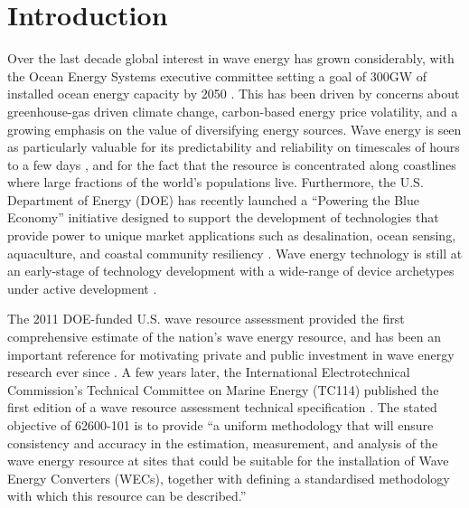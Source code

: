 \section{Introduction}

Over the last decade global interest in wave energy has grown
considerably, with the Ocean Energy Systems executive committee
setting a goal of 300GW of installed ocean energy capacity by 2050
\citep[]{huckerbyInternationalVisionOcean2017}. This has been driven
by concerns about greenhouse-gas driven climate change, carbon-based
energy price volatility, and a growing emphasis on the value of
diversifying energy sources. Wave energy is seen as particularly
valuable for its predictability and reliability on timescales of hours
to a few days \citep{parkinsonIntegratingOceanWave2015}, and for the
fact that the resource is concentrated along coastlines where large
fractions of the world's populations live. Furthermore, the
U.S. Department of Energy (DOE) has recently launched a ``Powering the Blue
Economy'' initiative designed to support the development of
technologies that provide power to unique market applications such as
desalination, ocean sensing, aquaculture, and coastal community
resiliency \citep{livecchiPoweringBlueEconomy2019}. Wave energy technology is still at an
early-stage of technology development with a wide-range of device
archetypes under active development
\citep[]{babaritOceanWaveEnergy2017}.

The 2011 DOE-funded U.S. wave resource assessment provided the first
comprehensive estimate of the nation’s wave energy resource, and has
been an important reference for motivating private and public
investment in wave energy research ever since
\citep[][hereafter `EPRI 2011']{EPRIwaveresource2011}. A few years later, the International Electrotechnical Commission's Technical Committee on
Marine Energy (TC114) published the first edition of a wave
resource assessment technical specification \citep[][hereafter, 62600-101]{internationalelectrotechnicalcommissionPart101Wave2015}. The stated objective of 62600-101 is to provide ``a uniform
methodology that will ensure consistency and accuracy in the
estimation, measurement, and analysis of the wave energy resource at
sites that could be suitable for the installation of Wave Energy
Converters (WECs), together with defining a standardised methodology
with which this resource can be described.''

